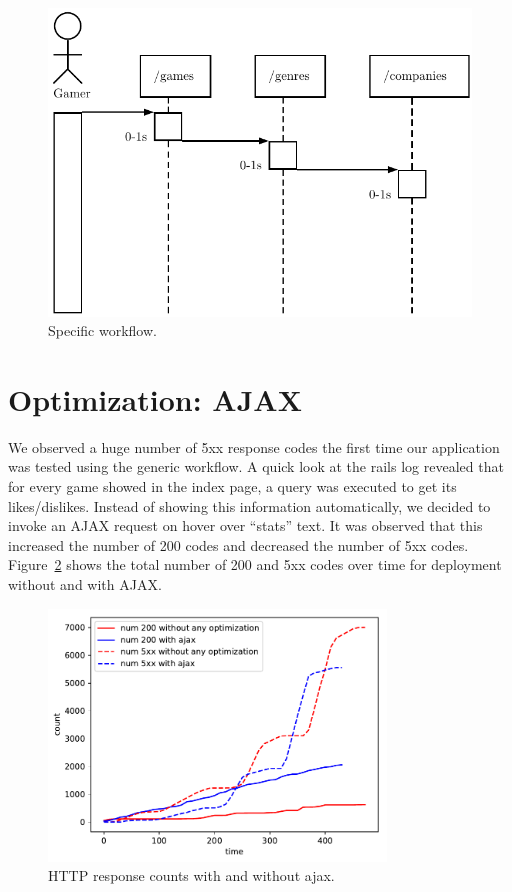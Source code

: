 \begin{figure}
	\centering
	\includegraphics{images/specific}
	\caption{Specific workflow.}\label{fig:specific}
\end{figure}

\section{Optimization: AJAX}
We observed a huge number of 5xx response codes the first time our application was tested using the generic workflow. A quick look at the rails log revealed that for every game showed in the index page, a query was executed to get its likes/dislikes. Instead of showing this information automatically, we decided to invoke an AJAX request on hover over ``stats'' text. It was observed that this increased the number of 200 codes and decreased the number of 5xx codes. Figure~\ref{fig:numcodes} shows the total number of 200 and 5xx codes over time for deployment without and with AJAX.
\begin{figure}
	\centering
	\includegraphics[width=0.8\textwidth]{images/without-any-optimization-with-ajax.pdf}
	\caption{HTTP response counts with and without ajax.}\label{fig:numcodes}
\end{figure}

